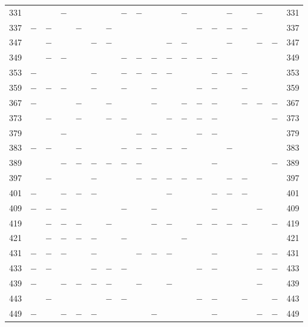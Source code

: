 \begin{center}
\begin{tabular}{r|c|c|c|c|c|c|c|c|c|c|c|c|c|c|c|c|c|r}
331 &  &  & $-$ &  &  &  & $-$ & $-$ &  &  & $-$ &  &  & $-$ &  & $-$ &  & 331\\
337 & $-$ & $-$ &  & $-$ &  & $-$ &  &  &  &  &  & $-$ & $-$ & $-$ & $-$ &  &  & 337\\
347 &  & $-$ &  &  & $-$ & $-$ &  &  &  & $-$ & $-$ &  &  & $-$ &  & $-$ & $-$ & 347\\
349 &  & $-$ & $-$ &  &  &  & $-$ & $-$ & $-$ & $-$ & $-$ & $-$ & $-$ &  &  &  &  & 349\\
353 & $-$ &  &  &  & $-$ &  & $-$ & $-$ & $-$ & $-$ &  &  & $-$ & $-$ & $-$ &  &  & 353\\
359 & $-$ & $-$ & $-$ &  & $-$ &  & $-$ &  & $-$ &  &  & $-$ & $-$ &  & $-$ &  &  & 359\\
367 & $-$ &  &  & $-$ &  & $-$ &  &  & $-$ &  & $-$ & $-$ & $-$ &  & $-$ & $-$ & $-$ & 367\\
373 &  & $-$ &  & $-$ &  & $-$ & $-$ &  &  & $-$ & $-$ & $-$ & $-$ &  &  &  & $-$ & 373\\
379 &  &  & $-$ &  &  &  &  & $-$ & $-$ &  &  & $-$ & $-$ &  &  &  &  & 379\\
383 & $-$ & $-$ &  & $-$ &  &  & $-$ & $-$ & $-$ & $-$ & $-$ &  &  & $-$ &  &  &  & 383\\
389 &  &  & $-$ & $-$ & $-$ & $-$ & $-$ & $-$ &  &  &  &  & $-$ &  &  &  & $-$ & 389\\
397 &  & $-$ &  &  & $-$ &  &  & $-$ & $-$ & $-$ & $-$ & $-$ &  & $-$ & $-$ &  &  & 397\\
401 & $-$ &  & $-$ & $-$ & $-$ &  &  &  &  & $-$ &  &  & $-$ & $-$ & $-$ &  &  & 401\\
409 & $-$ & $-$ & $-$ &  &  &  & $-$ &  & $-$ &  &  &  & $-$ &  &  & $-$ &  & 409\\
419 &  & $-$ & $-$ & $-$ &  & $-$ &  &  & $-$ & $-$ &  & $-$ & $-$ & $-$ & $-$ &  & $-$ & 419\\
421 &  & $-$ & $-$ & $-$ & $-$ &  & $-$ &  &  &  & $-$ &  &  &  &  &  &  & 421\\
431 & $-$ & $-$ & $-$ &  & $-$ &  &  & $-$ & $-$ & $-$ &  &  & $-$ &  &  & $-$ & $-$ & 431\\
433 & $-$ & $-$ &  &  & $-$ & $-$ & $-$ &  &  &  &  & $-$ & $-$ &  &  & $-$ & $-$ & 433\\
439 & $-$ &  & $-$ & $-$ & $-$ & $-$ &  & $-$ &  & $-$ &  &  &  &  &  & $-$ &  & 439\\
443 &  & $-$ &  &  &  & $-$ & $-$ &  &  &  &  & $-$ & $-$ &  & $-$ &  & $-$ & 443\\
449 & $-$ &  & $-$ & $-$ & $-$ &  &  &  & $-$ &  &  &  & $-$ &  &  & $-$ & $-$ & 449\\

\end{tabular}
\end{center}
